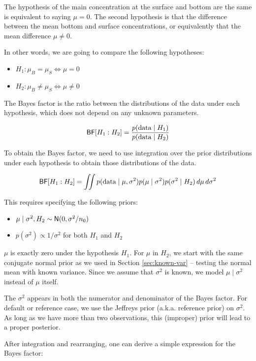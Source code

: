 \documentclass[]{book}
\providecommand{\tightlist}{%
  \setlength{\itemsep}{0pt}\setlength{\parskip}{0pt}}
\theoremstyle{definition}
\theoremstyle{definition}
\theoremstyle{definition}
\theoremstyle{remark}
\begin{document}
The hypothesis of the main concentration at the surface and bottom are
the same is equivalent to saying \(\mu = 0\). The second hypothesis is
that the difference between the mean bottom and surface concentrations,
or equivalently that the mean difference \(\mu \neq 0\).

In other words, we are going to compare the following hypotheses:

\begin{itemize}
\tightlist
\item
  \(H_1: \mu_B = \mu_S \Leftrightarrow \mu = 0\)
\item
  \(H_2: \mu_B \neq \mu_S \Leftrightarrow \mu \neq 0\)
\end{itemize}

The Bayes factor is the ratio between the distributions of the data
under each hypothesis, which does not depend on any unknown parameters.

\[\textsf{BF}[H_1 : H_2] = \frac{p(\text{data} \mid H_1)} {p(\text{data} \mid H_2)}\]

To obtain the Bayes factor, we need to use integration over the prior
distributions under each hypothesis to obtain those distributions of the
data.

\[\textsf{BF}[H_1 : H_2] = \iint p(\text{data} \mid \mu, \sigma^2) p(\mu \mid \sigma^2) p(\sigma^2 \mid H_2)\, d \mu \, d\sigma^2\]

This requires specifying the following priors:

\begin{itemize}
\tightlist
\item
  \(\mu \mid \sigma^2, H_2 \sim \textsf{N}(0, \sigma^2/n_0)\)
\item
  \(p(\sigma^2) \propto 1/\sigma^2\) for both \(H_1\) and \(H_2\)
\end{itemize}

\(\mu\) is exactly zero under the hypothesis \(H_1\). For \(\mu\) in
\(H_2\), we start with the same conjugate normal prior as we used in
Section \ref{sec:known-var} -- testing the normal mean with known
variance. Since we assume that \(\sigma^2\) is known, we model
\(\mu \mid \sigma^2\) instead of \(\mu\) itself.

The \(\sigma^2\) appears in both the numerator and denominator of the
Bayes factor. For default or reference case, we use the Jeffreys prior
(a.k.a. reference prior) on \(\sigma^2\). As long as we have more than
two observations, this (improper) prior will lead to a proper posterior.

After integration and rearranging, one can derive a simple expression
for the Bayes factor:
\end{document}
